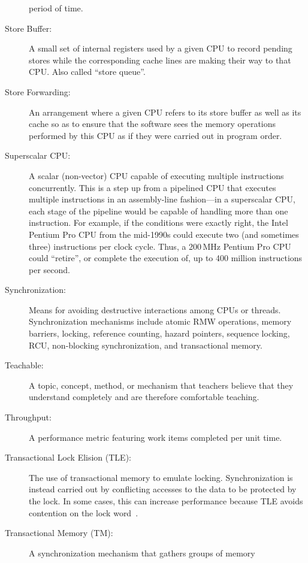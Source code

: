 \begin{description}
	period of time.
\item[Store Buffer:]
	A small set of internal registers used by a given CPU
	to record pending stores
	while the corresponding cache lines are making their
	way to that CPU\@.
	Also called ``store queue''.
\item[Store Forwarding:]
	An arrangement where a given CPU refers to its store buffer
	as well as its cache so as to ensure that the software sees
	the memory operations performed by this CPU as if they
	were carried out in program order.
\item[Superscalar CPU:]
	A scalar (non-vector) CPU capable of executing multiple instructions
	concurrently.
	This is a step up from a pipelined CPU that executes multiple
	instructions in an assembly-line fashion---in a superscalar
	CPU, each stage of the pipeline would be capable of handling
	more than one instruction.
	For example, if the conditions were exactly right,
	the Intel Pentium Pro CPU from the mid-1990s could
	execute two (and sometimes three) instructions per clock cycle.
	Thus, a 200\,MHz Pentium Pro CPU could ``retire'', or complete the
	execution of, up to 400 million instructions per second.
\item[Synchronization:]
	Means for avoiding destructive interactions among CPUs or threads.
	Synchronization mechanisms include atomic RMW operations, memory
	barriers, locking, reference counting, hazard pointers, sequence
	locking, RCU, non-blocking synchronization, and transactional
	memory.
\item[Teachable:]
	A topic, concept, method, or mechanism that teachers believe that
	they understand completely and are therefore comfortable teaching.
\item[Throughput:]
	A performance metric featuring work items completed per unit time.
\item[Transactional Lock Elision (TLE):]
	The use of transactional memory to emulate locking.
	Synchronization is instead carried out by conflicting accesses
	to the data to be protected by the lock.
	In some cases, this can increase performance because TLE
	avoids contention on the lock
	word~\cite{MartinPohlack2011HTM2TLE,Kleen:2014:SEL:2566590.2576793,PascalFelber2016rwlockElision,SeongJaePark2020HTMRCUlock}.
\item[Transactional Memory (TM):]
	A synchronization mechanism that gathers groups of memory

\end{description}
